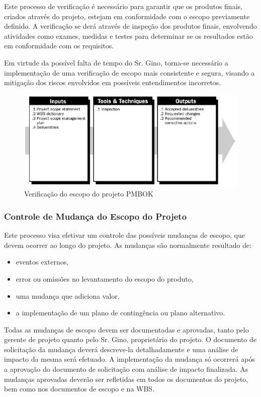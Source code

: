 Este processo de verificação é necessário para garantir que os produtos finais, criados através do projeto, estejam em conformidade com o escopo previamente definido. A verificação se derá através de inspeção dos produtos finais, envolvendo atividades como exames, medidas e testes para determinar se os resultados estão em conformidade com os requisitos.
 
Em virtude da possível falta de tempo do Sr. Gino, torna-se necessário a implementação de uma verificação de escopo mais consistente e segura, visando a mitigação dos riscos envolvidos em possíveis entendimentos incorretos.

\begin{figure}[H]
  \centering
  \includegraphics[width=1\textwidth]{softwareengineer/images/pmbok-scope-verification} 
  \caption{Verificação do escopo do projeto PMBOK}
  \label{fig:pmbok-scope-verification} 
\end{figure}

\subsubsection{Controle de Mudança do Escopo do Projeto}

Este processo visa efetivar um controle das possíveis mudanças de escopo, que devem ocorrer ao longo do projeto. As mudanças são normalmente resultado de:
\begin{itemize}
\item eventos externos,
\item error ou omissões no levantamento do escopo do produto,
\item uma mudança que adiciona valor,
\item a implementação de um plano de contingência ou plano alternativo.
\end{itemize}

Todas as mudanças de escopo devem ser documentadas e aprovadas, tanto pelo gerente de projeto quanto pelo Sr. Gino, proprietário do projeto. O documento de solicitação da mudança deverá descreve-la detalhadamente e uma análise de impacto da mesma será efetuado. A implementação da mudança só ocorrerá após a aprovação do documento de solicitação com análise de impacto finalizada.
As mudanças aprovadas deverão ser refletidas em todos os documentos do projeto, bem como nos documentos de escopo e na WBS.

